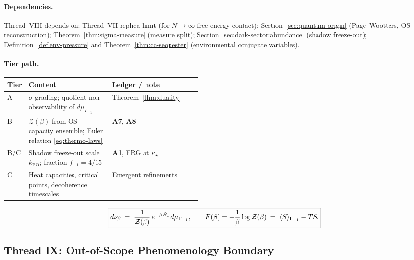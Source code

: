 \paragraph{Dependencies.}
Thread~VIII depends on:
Thread~VII replica limit (for $N\to\infty$ free-energy contact);
Section~\ref{sec:quantum-origin} (Page--Wootters, OS reconstruction);
Theorem~\ref{thm:sigma-measure} (measure split);
Section~\ref{sec:dark-sector:abundance} (shadow freeze-out);
Definition~\ref{def:env-pressure} and Theorem~\ref{thm:cc-sequester}
(environmental conjugate variables).

\paragraph{Tier path.}
\begin{center}
\small
\renewcommand{\arraystretch}{1.1}
\begin{tabular}{@{}llp{0.46\linewidth}@{}}
\toprule
\textbf{Tier} & \textbf{Content} & \textbf{Ledger / note} \\
\midrule
A &
  $\sigma$-grading; quotient non-observability of $d\mu_{\Gamma_{+1}}$ &
  Theorem~\ref{thm:duality} \\
B &
  $\mathcal{Z}(\beta)$ from OS + capacity ensemble;
  Euler relation \eqref{eq:thermo-laws} &
  \textbf{A7}, \textbf{A8} \\
B/C &
  Shadow freeze-out scale $k_{\mathrm{FO}}$; fraction $f_{+1}=4/15$ &
  \textbf{A1}, FRG at $\kappa_\star$ \\
C &
  Heat capacities, critical points, decoherence timescales &
  Emergent refinements \\
\bottomrule
\end{tabular}
\end{center}

\begin{equation}\label{eq:thread-8-box}
  \boxed{%
  d\nu_\beta
  \;=\;
  \frac{1}{\mathcal{Z}(\beta)}\,
  e^{-\beta\hat H_\iota}\,
  d\mu_{\Gamma_{-1}},
  \qquad
  F(\beta)=-\frac{1}{\beta}\log\mathcal{Z}(\beta)
  \;=\;
  \langle S\rangle_{\Gamma_{-1}}-TS.}
\end{equation}

\subsection{Thread IX: Out-of-Scope Phenomenology Boundary}
\label{sec:thread-9}

